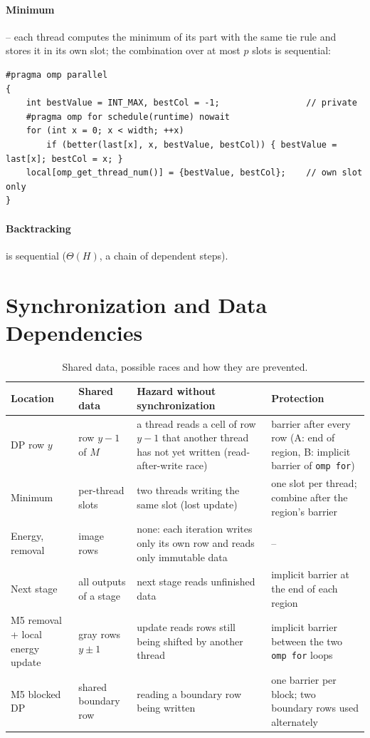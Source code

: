 \documentclass[11pt,a4paper]{article}
\begin{document}
\paragraph{Minimum} -- each thread computes the minimum of its part with the same tie rule and stores it
in its own slot; the combination over at most $p$ slots is sequential:
\begin{lstlisting}[style=cpp]
#pragma omp parallel
{
    int bestValue = INT_MAX, bestCol = -1;                 // private
    #pragma omp for schedule(runtime) nowait
    for (int x = 0; x < width; ++x)
        if (better(last[x], x, bestValue, bestCol)) { bestValue = last[x]; bestCol = x; }
    local[omp_get_thread_num()] = {bestValue, bestCol};    // own slot only
}
\end{lstlisting}

\paragraph{Backtracking} is sequential ($\Theta(H)$, a chain of dependent steps).

\section{Synchronization and Data Dependencies}

\begin{table}[ht]
\centering\small
\begin{tabularx}{\textwidth}{@{}>{\raggedright\arraybackslash}p{2.6cm}>{\raggedright\arraybackslash}p{2.3cm}>{\raggedright\arraybackslash}X>{\raggedright\arraybackslash}p{3.8cm}@{}}
\toprule
Location & Shared data & Hazard without synchronization & Protection \\
\midrule
DP row $y$ & row $y-1$ of $M$ & a thread reads a cell of row $y-1$ that another thread has not yet written (read-after-write race) & barrier after every row (A: end of region, B: implicit barrier of \texttt{omp for}) \\
Minimum & per-thread slots & two threads writing the same slot (lost update) & one slot per thread; combine after the region's barrier \\
Energy, removal & image rows & none: each iteration writes only its own row and reads only immutable data & -- \\
Next stage & all outputs of a stage & next stage reads unfinished data & implicit barrier at the end of each region \\
M5 removal + local energy update & gray rows $y\pm1$ & update reads rows still being shifted by another thread & implicit barrier between the two \texttt{omp for} loops \\
M5 blocked DP & shared boundary row & reading a boundary row being written & one barrier per block; two boundary rows used alternately \\
\bottomrule
\end{tabularx}
\caption{Shared data, possible races and how they are prevented.}
\end{table}
\end{document}
